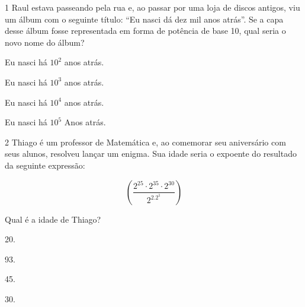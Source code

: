 \num{1} Raul estava passeando pela rua e, ao passar por uma loja de discos
antigos, viu um álbum com o seguinte título: ``Eu nasci dá dez mil anos
atrás''. Se a capa desse álbum fosse representada em forma de potência
de base 10, qual seria o novo nome do álbum?

\begin{escolha}[itemsep=0pt]
\item Eu nasci há $10^2$ anos atrás.
\item Eu nasci há $10^3$ anos atrás.
\item Eu nasci há $10^4$ anos atrás.
\item Eu nasci há $10^5$ Anos atrás.
\end{escolha}









\num{2} Thiago é um professor de Matemática e, ao comemorar seu aniversário
com seus alunos, resolveu lançar um enigma. Sua idade seria o expoente
do resultado da seguinte expressão:

$$(\frac{2^{25} \cdot 2^{35} \cdot 2^{30}} {2^2.2^1})$$

Qual é a idade de Thiago?

\begin{escolha}[itemsep=0pt]
\item 20.
\item 93.
\item 45.
\item 30.
\end{escolha}



